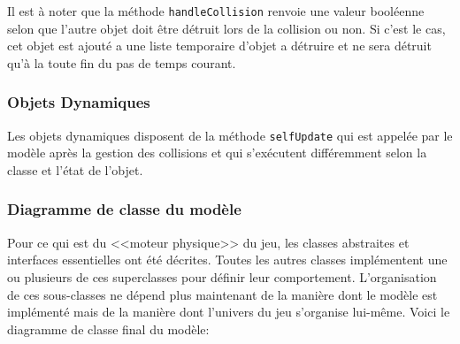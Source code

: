 \documentclass[a4paper, 12pt]{article}
\begin{document}
Il est à noter que la méthode {\tt handleCollision} renvoie une valeur booléenne selon que l'autre objet doit être détruit lors de la collision ou non. Si c'est le cas, cet objet est ajouté a une liste temporaire d'objet a détruire et ne sera détruit qu'à la toute fin du pas de temps courant.

\subsubsection{Objets Dynamiques}

Les objets dynamiques disposent de la méthode {\tt selfUpdate} qui est appelée par le modèle après la gestion des collisions et qui s'exécutent différemment selon la classe et l'état de l'objet.

\subsubsection{Diagramme de classe du modèle}

Pour ce qui est du <<moteur physique>> du jeu, les classes abstraites et interfaces essentielles ont été décrites. Toutes les autres classes implémentent une ou plusieurs de ces superclasses pour définir leur comportement. L'organisation de ces sous-classes ne dépend plus maintenant de la manière dont le modèle est implémenté mais de la manière dont l'univers du jeu s'organise lui-même.
Voici le diagramme de classe final du modèle:
\end{document}
